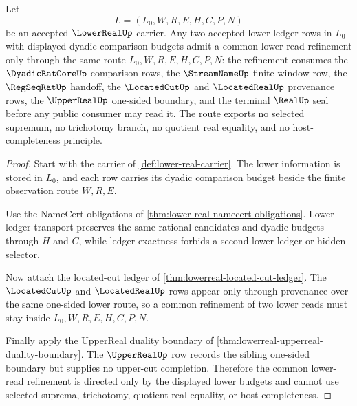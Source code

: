 \begin{theorem}
\label{thm:lowerreal-directed-lower-cut-budget}
Let
$$
L=(L_0,W,R,E,H,C,P,N)
$$
be an accepted $\LowerRealUp$ carrier. Any two accepted lower-ledger rows in $L_0$ with displayed dyadic comparison budgets admit a common lower-read refinement only through the same route $L_0,W,R,E,H,C,P,N$: the refinement consumes the $\DyadicRatCoreUp$ comparison rows, the $\StreamNameUp$ finite-window row, the $\RegSeqRatUp$ handoff, the $\LocatedCutUp$ and $\LocatedRealUp$ provenance rows, the $\UpperRealUp$ one-sided boundary, and the terminal $\RealUp$ seal before any public consumer may read it. The route exports no selected supremum, no trichotomy branch, no quotient real equality, and no host-completeness principle.
\end{theorem}
\begin{proof}
Start with the carrier of \autoref{def:lower-real-carrier}. The lower information is stored in $L_0$, and each row carries its dyadic comparison budget beside the finite observation route $W,R,E$.

Use the NameCert obligations of \autoref{thm:lower-real-namecert-obligations}. Lower-ledger transport preserves the same rational candidates and dyadic budgets through $H$ and $C$, while ledger exactness forbids a second lower ledger or hidden selector.

Now attach the located-cut ledger of \autoref{thm:lowerreal-located-cut-ledger}. The $\LocatedCutUp$ and $\LocatedRealUp$ rows appear only through provenance over the same one-sided lower route, so a common refinement of two lower reads must stay inside $L_0,W,R,E,H,C,P,N$.

Finally apply the UpperReal duality boundary of \autoref{thm:lowerreal-upperreal-duality-boundary}. The $\UpperRealUp$ row records the sibling one-sided boundary but supplies no upper-cut completion. Therefore the common lower-read refinement is directed only by the displayed lower budgets and cannot use selected suprema, trichotomy, quotient real equality, or host completeness.
\end{proof}

